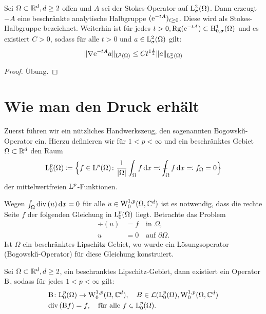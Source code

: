 \begin{thm}
  Sei $\Omega \subset \mathbb{R}^d, d \geq 2$ offen und $A$ sei der Stokes-Operator auf $\mathrm{L}^2_\sigma(\Omega)$.
  Dann erzeugt $-A$ eine beschränkte analytische Halbgruppe $(\mathrm{e}^{-tA})_{t \geq 0}$.
  Diese wird als Stokes-Halbgruppe bezeichnet.
  Weiterhin ist für jedes $t > 0, \operatorname{Rg}(\mathrm{e}^{-tA}) \subset \mathrm{H}_{0,\sigma}^1(\Omega)$ und es existiert $C > 0$, sodass für alle $t > 0$ und $a \in \mathrm{L}_\sigma^2(\Omega)$ gilt:
  $$
  \|\nabla \mathrm{e}^{-tA} a \|_{\mathrm{L}^2(\Omega)} \leq C t^{1\frac{1}{2}} \|a\|_{\mathrm{L}_\sigma^2(\Omega)}
  $$
\end{thm}

\begin{proof}
  Übung.
\end{proof}

\section{Wie man den Druck erhält}

Zuerst führen wir ein nützliches Handwerkszeug, den sogenannten Bogowski\u{\i}-Operator ein.
Hierzu definieren wir für $1 < p < \infty$ und ein beschränktes Gebiet $\Omega \subset \mathbb{R}^d$ den Raum
$$
\Ell^p_0(\Omega) \coloneqq \Big\{ f \in \Ell^p(\Omega) \colon \frac{1}{|\Omega|} \int_\Omega f \d x \eqqcolon \dashint_\Omega f \d x \eqqcolon f_\Omega = 0 \Big\}
$$
der mittelwertfreien $\mathrm{L}^p$-Funktionen.

Wegen $\int_\Omega \mathrm{div\,} (u) \, {\operatorname{d}\!{x}} = 0$ für alle $u \in \mathrm{W}_0^{1,p}(\Omega, \mathbb{C}^d)$ ist es notwendig, dass die rechte Seite $f$ der folgenden Gleichung in $\mathrm{L}^p_0(\Omega)$ liegt.
Betrachte das Problem
\begin{align*}
  \div(u) &= f \quad\text{in } \Omega, \\
  u &= 0 \quad\text{auf } \partial \Omega.
\end{align*}
Ist $\Omega$ ein beschränktes Lipschitz-Gebiet, wo wurde ein Lösungsoperator (Bogowski\u{\i}-Operator) für diese Gleichung konstruiert.

\begin{thm}
  \label{thm:bogowskii}
  Sei $\Omega \subset \mathbb{R}^d, d \geq 2$, ein beschranktes Lipschitz-Gebiet, dann existiert ein Operator $\mathrm{B}$, sodass für jedes $1 < p < \infty$ gilt:
  \begin{align*}
    &\mathrm{B} \colon \mathrm{L}_0^p(\Omega) \to \mathrm{W}_0^{1,p}(\Omega, \mathbb{C}^d), \quad B \in \mathcal{L}(\mathrm{L}_0^p(\Omega), \mathrm{W}_0^{1,p}(\Omega, \mathbb{C}^d) \\
    &\mathrm{div\,} (\mathrm{B} f) = f, \quad\text{für alle } f \in \mathrm{L}_0^p(\Omega).
  \end{align*}
\end{thm}

